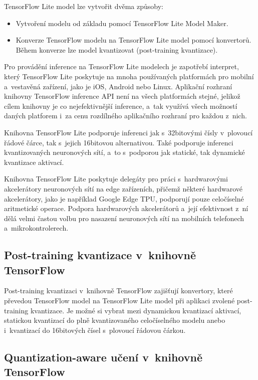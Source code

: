 TensorFlow Lite model lze vytvořit dvěma způsoby:
\begin{itemize}
    \item Vytvoření modelu od základu pomocí TensorFlow Lite Model Maker.
    \item Konverze TensorFlow modelu na TensorFlow Lite model pomocí konvertorů. Během konverze lze model kvantizovat (post-training kvantizace).
\end{itemize}

Pro provádění inference na TensorFlow Lite modelech je zapotřebí interpret, který TensorFlow Lite poskytuje na mnoha používaných platformách pro mobilní a~vestavěná zařízení, jako je iOS, Android nebo Linux. Aplikační rozhraní knihovny TensorFlow inference API není na všech platformách stejné, jelikož cílem knihovny je co nejefektivnější inference, a~tak využívá všech možností daných platforem i~za cenu rozdílného aplikačního rozhraní pro každou z~nich.

Knihovna TensorFlow Lite podporuje inferenci jak s~32bitovými čísly v~plovoucí řádové čárce, tak s~jejich 16bitovou alternativou. Také podporuje inferenci kvantizovaných neuronových sítí, a~to s~podporou jak statické, tak dynamické kvantizace aktivací.

Knihovna TensorFlow Lite poskytuje delegáty pro práci s~hardwarovými akcelerátory neuronových sítí na edge zařízeních, přičemž některé hardwarové akcelerátory, jako je například Google Edge TPU, podporují pouze celočíselné aritmetické operace. Podpora hardwarových akcelerátorů a~její efektivnost z~ní dělá velmi častou volbu pro nasazení neuronových sítí na mobilních telefonech a~mikrokontrolerech.

\subsection{Post-training kvantizace v~knihovně TensorFlow}

Post-training kvantizaci v~knihovně TensorFlow zajišťují konvertory, které převedou TensorFlow model na TensorFlow Lite model při aplikaci zvolené post-training kvantizace. Je možné si vybrat mezi dynamickou kvantizací aktivací, statickou kvantizací do plně kvantizovaného celočíselného modelu anebo i~kvantizací do 16bitových čísel s~plovoucí řádovou čárkou.

\subsection{Quantization-aware učení v~knihovně TensorFlow}


